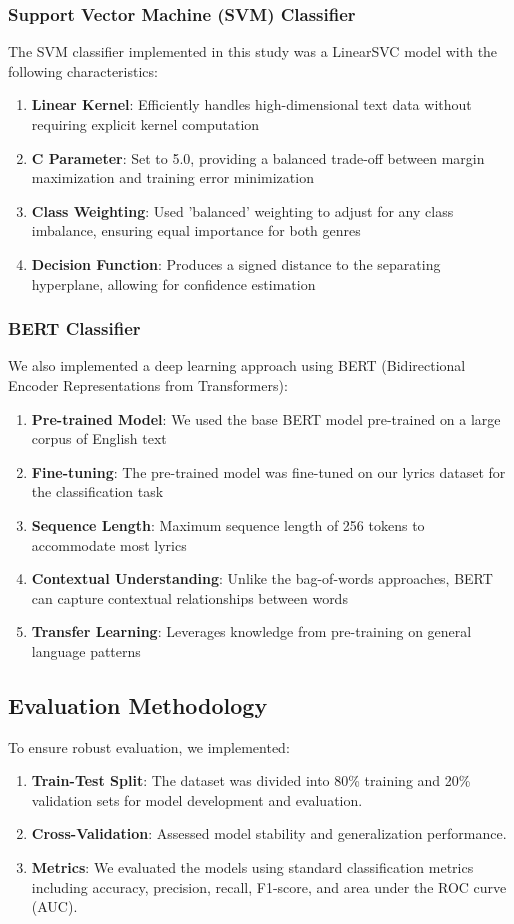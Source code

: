 \documentclass[conference]{IEEEtran}
\begin{document}
\subsubsection{Support Vector Machine (SVM) Classifier}
The SVM classifier implemented in this study was a LinearSVC model with the following characteristics:
\begin{enumerate}
\item \textbf{Linear Kernel}: Efficiently handles high-dimensional text data without requiring explicit kernel computation
\item \textbf{C Parameter}: Set to 5.0, providing a balanced trade-off between margin maximization and training error minimization
\item \textbf{Class Weighting}: Used 'balanced' weighting to adjust for any class imbalance, ensuring equal importance for both genres
\item \textbf{Decision Function}: Produces a signed distance to the separating hyperplane, allowing for confidence estimation
\end{enumerate}

\subsubsection{BERT Classifier}
We also implemented a deep learning approach using BERT (Bidirectional Encoder Representations from Transformers):
\begin{enumerate}
\item \textbf{Pre-trained Model}: We used the base BERT model pre-trained on a large corpus of English text
\item \textbf{Fine-tuning}: The pre-trained model was fine-tuned on our lyrics dataset for the classification task
\item \textbf{Sequence Length}: Maximum sequence length of 256 tokens to accommodate most lyrics
\item \textbf{Contextual Understanding}: Unlike the bag-of-words approaches, BERT can capture contextual relationships between words
\item \textbf{Transfer Learning}: Leverages knowledge from pre-training on general language patterns
\end{enumerate}

\subsection{Evaluation Methodology}
To ensure robust evaluation, we implemented:
\begin{enumerate}
\item \textbf{Train-Test Split}: The dataset was divided into 80\% training and 20\% validation sets for model development and evaluation.
\item \textbf{Cross-Validation}: Assessed model stability and generalization performance.
\item \textbf{Metrics}: We evaluated the models using standard classification metrics including accuracy, precision, recall, F1-score, and area under the ROC curve (AUC).
\end{enumerate}
\end{document}

